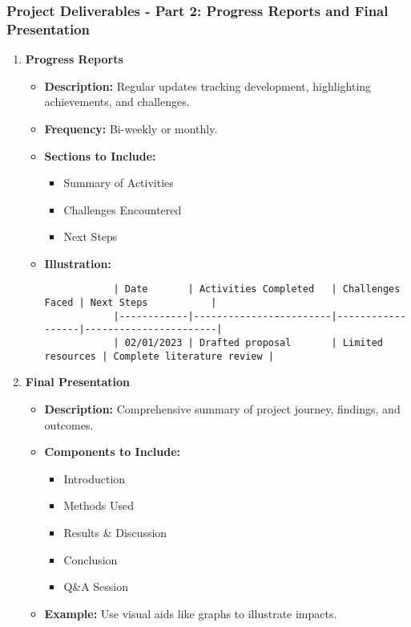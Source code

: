 \documentclass[aspectratio=169]{beamer}
\begin{document}
\begin{frame}[fragile]
    \frametitle{Project Deliverables - Part 2: Progress Reports and Final Presentation}
    \begin{enumerate}[resume]
        \item \textbf{Progress Reports}
        \begin{itemize}
            \item \textbf{Description:} Regular updates tracking development, highlighting achievements, and challenges.
            \item \textbf{Frequency:} Bi-weekly or monthly.
            \item \textbf{Sections to Include:}
            \begin{itemize}
                \item Summary of Activities
                \item Challenges Encountered
                \item Next Steps
            \end{itemize}
            \item \textbf{Illustration:}
            \begin{lstlisting}
            | Date       | Activities Completed   | Challenges Faced | Next Steps           |
            |------------|------------------------|------------------|-----------------------|
            | 02/01/2023 | Drafted proposal       | Limited resources | Complete literature review |
            \end{lstlisting}
        \end{itemize}

        \item \textbf{Final Presentation}
        \begin{itemize}
            \item \textbf{Description:} Comprehensive summary of project journey, findings, and outcomes.
            \item \textbf{Components to Include:}
            \begin{itemize}
                \item Introduction
                \item Methods Used
                \item Results \& Discussion
                \item Conclusion
                \item Q\&A Session
            \end{itemize}
            \item \textbf{Example:} Use visual aids like graphs to illustrate impacts.
        \end{itemize}
    \end{enumerate}
\end{frame}
\end{document}
